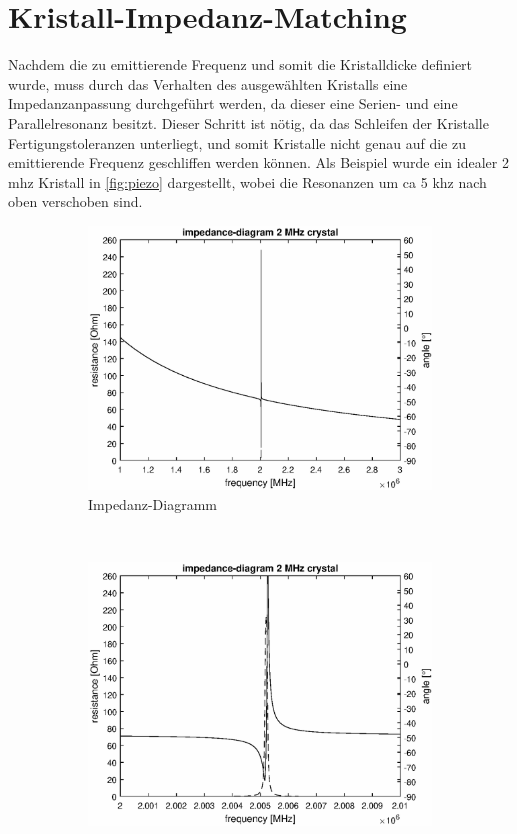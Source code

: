 \section{Kristall-Impedanz-Matching}
Nachdem die zu emittierende Frequenz und somit die Kristalldicke definiert wurde, muss durch das Verhalten des ausgewählten Kristalls eine Impedanzanpassung durchgeführt werden, da dieser eine Serien- und eine Parallelresonanz besitzt. Dieser Schritt ist nötig, da das Schleifen der Kristalle Fertigungstoleranzen unterliegt, und somit Kristalle nicht genau auf die zu emittierende Frequenz geschliffen werden können. Als Beispiel wurde ein idealer 2 \ac{mhz} Kristall in \autoref{fig:piezo} dargestellt, wobei die Resonanzen um \ac{ca} 5 \ac{khz} nach oben verschoben sind.
\begin{figure}[h!]
	\centering
        \begin{subfigure}[t]{0.48\textwidth}
                \includegraphics[width=1\textwidth]{images/Ultrasound/zoom_out.eps}
	    		\caption{Impedanz-Diagramm}
	    		\label{fig:imp_2mhz_without}
        \end{subfigure}
        ~ %
        \begin{subfigure}[t]{0.48\textwidth}
        	 \includegraphics[width=1\textwidth]{images/Ultrasound/zoom_in.eps}

\end{subfigure}
\end{figure}
